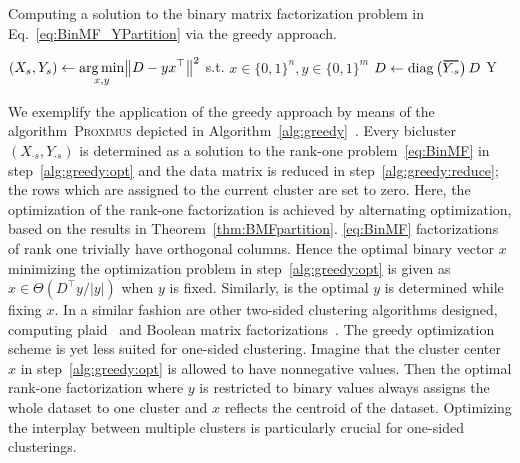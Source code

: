 \begin{algorithm}[t]
\caption{Computing a solution to the binary matrix factorization problem in Eq.~\eqref{eq:BinMF_YPartition} via the greedy approach.} 
\begin{algorithmic}[1]
    	\State $\displaystyle(X_s,Y_s)\gets \operatorname*{arg\,min}_{x,y} \bigl\lVert D-yx^\top\bigr\rVert ^2 $ \hfill s.t. $x\in\{0,1\}^n,y\in\{0,1\}^m$
    	\label{alg:greedy:opt}
    	\State $D\gets \diag\left(\thickbar{Y_{\cdot s}}\right)D$ \label{alg:greedy:reduce}
    \EndFor
    \State \Return Y
  \EndFunction
\end{algorithmic}
\label{alg:greedy}
\end{algorithm}

We exemplify the application of the greedy approach by means of the algorithm~\textsc{Proximus} depicted in Algorithm~\ref{alg:greedy}~\citep{koyuturk2003proximus}. Every bicluster $(X_{\cdot s},Y_{\cdot s})$ is determined as a solution to the rank-one problem~\ref{eq:BinMF} in step~\ref{alg:greedy:opt} and the data matrix is reduced in step~\ref{alg:greedy:reduce}; the rows which are assigned to the current cluster are set to zero. Here, the optimization of the rank-one factorization is achieved by alternating optimization, based on the results in Theorem~\ref{thm:BMFpartition}. \ref{eq:BinMF} factorizations of rank one trivially have orthogonal columns. Hence the optimal binary vector $x$ minimizing the optimization problem in step~\ref{alg:greedy:opt} is given as $x\in\Theta(D^\top y/\lvert y\rvert )$ when $y$ is fixed. Similarly, is the optimal $y$ is determined while fixing $x$. In a similar fashion are other two-sided clustering algorithms designed, computing plaid~\citep{cheng2000biclustering, lazzeroni2002plaid,turner2005improved} and Boolean matrix factorizations~\citep{miettinen2008discrete, geerts2004tiling}. The greedy optimization scheme is yet less suited for  one-sided clustering. Imagine that the cluster center $x$ in step~\ref{alg:greedy:opt} is allowed to have nonnegative values. Then the optimal rank-one factorization where $y$ is restricted to binary values always assigns the whole dataset to one cluster and $x$ reflects the centroid of the dataset. Optimizing the interplay between multiple clusters is particularly crucial for one-sided clusterings.
